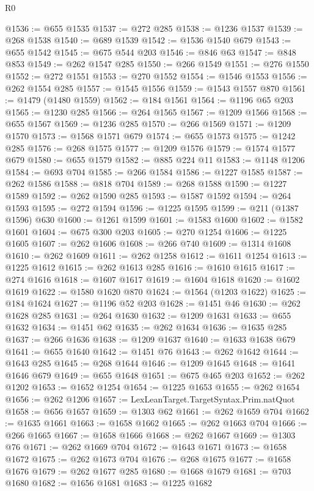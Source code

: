 \begin{lexlean}{R0}
\begin{coremodule}
@1536 := @655 @1535
@1537 := @272 @285
@1538 := @1236 @1537
@1539 := @268 @1538
@1540 := @689 @1539
@1542 := @1536 @1540 @679
@1543 := @655 @1542
@1545 := @675 @544 @203
@1546 := @846 @63
@1547 := @848 @853
@1549 := @262 @1547 @285
@1550 := @266 @1549
@1551 := @276 @1550
@1552 := @272 @1551
@1553 := @270 @1552
@1554 := @1546 @1553
@1556 := @262 @1554 @285
@1557 := @1545 @1556
@1559 := @1543 @1557 @870
@1561 := @1479 (@1480 @1559)
@1562 := @184 @1561
@1564 := @1196 @65 @203
@1565 := @1230 @285
@1566 := @264 @1565
@1567 := @1209 @1566
@1568 := @655 @1567
@1569 := @1236 @285
@1570 := @266 @1569
@1571 := @1209 @1570
@1573 := @1568 @1571 @679
@1574 := @655 @1573
@1575 := @1242 @285
@1576 := @268 @1575
@1577 := @1209 @1576
@1579 := @1574 @1577 @679
@1580 := @655 @1579
@1582 := @885 @224 @11
@1583 := @1148 @1206
@1584 := @693 @704
@1585 := @266 @1584
@1586 := @1227 @1585
@1587 := @262 @1586
@1588 := @818 @704
@1589 := @268 @1588
@1590 := @1227 @1589
@1592 := @262 @1590 @285
@1593 := @1587 @1592
@1594 := @264 @1593
@1595 := @272 @1594
@1596 := @1225 @1595
@1599 := @211 (@1387 @1596) @630
@1600 := @1261 @1599
@1601 := @1583 @1600
@1602 := @1582 @1601
@1604 := @675 @300 @203
@1605 := @270 @1254
@1606 := @1225 @1605
@1607 := @262 @1606
@1608 := @266 @740
@1609 := @1314 @1608
@1610 := @262 @1609
@1611 := @262 @1258
@1612 := @1611 @1254
@1613 := @1225 @1612
@1615 := @262 @1613 @285
@1616 := @1610 @1615
@1617 := @274 @1616
@1618 := @1607 @1617
@1619 := @1604 @1618
@1620 := @1602 @1619
@1622 := @1580 @1620 @870
@1624 := @1564 (@1203 @1622)
@1625 := @184 @1624
@1627 := @1196 @52 @203
@1628 := @1451 @46
@1630 := @262 @1628 @285
@1631 := @264 @1630
@1632 := @1209 @1631
@1633 := @655 @1632
@1634 := @1451 @62
@1635 := @262 @1634
@1636 := @1635 @285
@1637 := @266 @1636
@1638 := @1209 @1637
@1640 := @1633 @1638 @679
@1641 := @655 @1640
@1642 := @1451 @76
@1643 := @262 @1642
@1644 := @1643 @285
@1645 := @268 @1644
@1646 := @1209 @1645
@1648 := @1641 @1646 @679
@1649 := @655 @1648
@1651 := @675 @465 @203
@1652 := @262 @1202
@1653 := @1652 @1254
@1654 := @1225 @1653
@1655 := @262 @1654
@1656 := @262 @1206
@1657 := LexLeanTarget.TargetSyntax.Prim.natQuot
@1658 := @656 @1657
@1659 := @1303 @62
@1661 := @262 @1659 @704
@1662 := @1635 @1661
@1663 := @1658 @1662
@1665 := @262 @1663 @704
@1666 := @266 @1665
@1667 := @1658 @1666
@1668 := @262 @1667
@1669 := @1303 @76
@1671 := @262 @1669 @704
@1672 := @1643 @1671
@1673 := @1658 @1672
@1675 := @262 @1673 @704
@1676 := @268 @1675
@1677 := @1658 @1676
@1679 := @262 @1677 @285
@1680 := @1668 @1679
@1681 := @703 @1680
@1682 := @1656 @1681
@1683 := @1225 @1682

\end{coremodule}
\end{lexlean}

